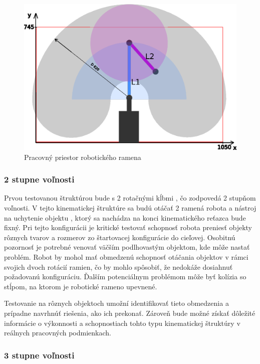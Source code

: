 \begin{figure}[]
	\centering
	\includegraphics[width=140mm]{img/SCARA-workspace.eps}
	\caption{Pracovný priestor robotického ramena}\label{OBRAZOK 1.2.3} 
\end{figure} 


\subsubsection{2 stupne voľnosti}
\label{kap:1.2.1}

Prvou testovanou štruktúrou bude s 2 rotačnými kĺbmi , čo zodpovedá 2 stupňom voľnosti. V tejto kinematickej štruktúre sa budú otáčať 2 ramená robota a nástroj na uchytenie objektu , ktorý sa nachádza na konci kinematického reťazca bude fixný.
Pri tejto konfigurácii je kritické testovať schopnosť robota preniesť objekty rôznych tvarov a rozmerov zo štartovacej konfigurácie do cieľovej. Osobitnú pozornosť je potrebné venovať väčším podlhovastým objektom, kde môže nastať problém. Robot by mohol mať obmedzenú schopnosť otáčania objektov v rámci svojich dvoch rotácií ramien, čo by mohlo spôsobiť, že nedokáže dosiahnuť požadovanú konfiguráciu. Ďalším potenciálnym problémom môže byť kolízia so stĺpom, na ktorom je robotické rameno upevnené.

Testovanie na rôznych objektoch umožní identifikovať tieto obmedzenia a prípadne navrhnúť riešenia, ako ich prekonať. Zároveň bude možné získať dôležité informácie o výkonnosti a schopnostiach tohto typu kinematickej štruktúry v reálnych pracovných podmienkach.


\subsubsection{3 stupne voľnosti}
\label{kap:1.2.2}

